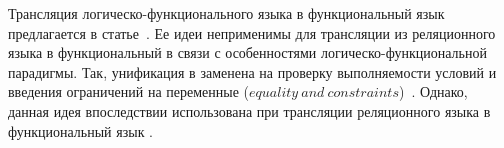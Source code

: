 Трансляция логическо-функционального языка \curry{} в функциональный язык \haskell{} предлагается в статье~\cite{Bernd2011FCL}.
Ее идеи неприменимы для трансляции из реляционного языка в функциональный в связи с особенностями логическо-функциональной парадигмы.
Так, унификация в \curry{} заменена на проверку выполняемости условий и введения ограничений на переменные ($equality \ and \ constraints$)~\cite{Hanus2016CIF}.
Однако, данная идея впоследствии использована при трансляции реляционного языка \miniKanren{} в функциональный язык \haskell{}.

